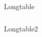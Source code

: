 \documentclass{article}
\begin{document}
\listoftables

\begin{longtable}{l}
\caption{Longtable} \\
\end{longtable}


\begin{longtable}{l}
\caption{Longtable2} \\
\end{longtable}
\end{document}
